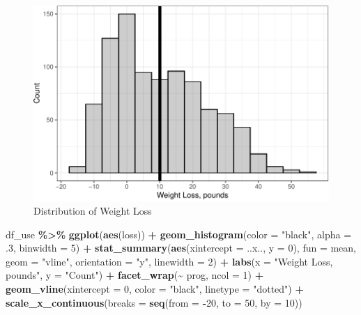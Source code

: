 \documentclass[
]{article}
\newenvironment{Shaded}{\begin{snugshade}}{\end{snugshade}}
\newcommand{\AttributeTok}[1]{\textcolor[rgb]{0.13,0.29,0.53}{#1}}
\newcommand{\DecValTok}[1]{\textcolor[rgb]{0.00,0.00,0.81}{#1}}
\newcommand{\FunctionTok}[1]{\textcolor[rgb]{0.13,0.29,0.53}{\textbf{#1}}}
\newcommand{\NormalTok}[1]{#1}
\newcommand{\SpecialCharTok}[1]{\textcolor[rgb]{0.81,0.36,0.00}{\textbf{#1}}}
\newcommand{\StringTok}[1]{\textcolor[rgb]{0.31,0.60,0.02}{#1}}
\begin{document}
\begin{figure}[hb]

\includegraphics{Appendix_ex_weightloss_files/figure-latex/unnamed-chunk-27-1} \hfill{}

\caption{Distribution of Weight Loss}\label{fig:unnamed-chunk-27}
\end{figure}

\clearpage

\begin{Shaded}
\begin{Highlighting}[]
\NormalTok{df\_use }\SpecialCharTok{\%\textgreater{}\%} 
  \FunctionTok{ggplot}\NormalTok{(}\FunctionTok{aes}\NormalTok{(loss)) }\SpecialCharTok{+} 
  \FunctionTok{geom\_histogram}\NormalTok{(}\AttributeTok{color =} \StringTok{"black"}\NormalTok{,}
                 \AttributeTok{alpha =}\NormalTok{ .}\DecValTok{3}\NormalTok{,}
                 \AttributeTok{binwidth =} \DecValTok{5}\NormalTok{) }\SpecialCharTok{+}
  \FunctionTok{stat\_summary}\NormalTok{(}\FunctionTok{aes}\NormalTok{(}\AttributeTok{xintercept =}\NormalTok{ ..x.., }\AttributeTok{y =} \DecValTok{0}\NormalTok{),}
               \AttributeTok{fun =}\NormalTok{ mean,}
               \AttributeTok{geom =} \StringTok{"vline"}\NormalTok{,}
               \AttributeTok{orientation =} \StringTok{"y"}\NormalTok{,}
               \AttributeTok{linewidth =} \DecValTok{2}\NormalTok{) }\SpecialCharTok{+}
  \FunctionTok{labs}\NormalTok{(}\AttributeTok{x =} \StringTok{"Weight Loss, pounds"}\NormalTok{,}
       \AttributeTok{y =} \StringTok{"Count"}\NormalTok{) }\SpecialCharTok{+}
  \FunctionTok{facet\_wrap}\NormalTok{(}\SpecialCharTok{\textasciitilde{}}\NormalTok{ prog, }\AttributeTok{ncol =} \DecValTok{1}\NormalTok{) }\SpecialCharTok{+}
  \FunctionTok{geom\_vline}\NormalTok{(}\AttributeTok{xintercept =} \DecValTok{0}\NormalTok{, }\AttributeTok{color =} \StringTok{"black"}\NormalTok{, }\AttributeTok{linetype =} \StringTok{"dotted"}\NormalTok{) }\SpecialCharTok{+}
  \FunctionTok{scale\_x\_continuous}\NormalTok{(}\AttributeTok{breaks =} \FunctionTok{seq}\NormalTok{(}\AttributeTok{from =} \SpecialCharTok{{-}}\DecValTok{20}\NormalTok{, }\AttributeTok{to =} \DecValTok{50}\NormalTok{, }\AttributeTok{by =} \DecValTok{10}\NormalTok{)) }
\end{Highlighting}
\end{Shaded}
\end{document}
